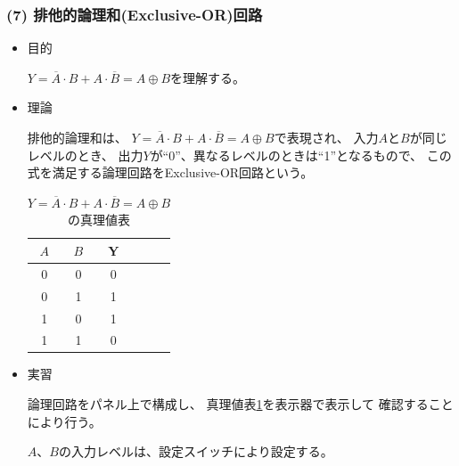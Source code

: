 \documentclass[12pt]{jarticle}
\begin{document}
\subsubsection*{(7) 排他的論理和(Exclusive-OR)回路}
\begin{itemize}
    \item 目的

          $Y = \overline{A} \cdot B + A \cdot \overline{B} = A \oplus B$を理解する。

    \item 理論

          排他的論理和は、
          $Y = \overline{A} \cdot B + A \cdot \overline{B} = A \oplus B$で表現され、
          入力$A$と$B$が同じレベルのとき、
          出力$Y$が``0''、異なるレベルのときは``1''となるもので、
          この式を満足する論理回路をExclusive-OR回路という。

          \begin{table}[h]
              \caption{$Y = \overline{A} \cdot B + A \cdot \overline{B} = A \oplus B$ の真理値表}
              \begin{center}
                  \begin{tabular}{|c|c|c|c|c|}
                      \hline
                      $A$ & $B$ & Y \\
                      \hline
                      0   & 0   & 0 \\
                      \hline
                      0   & 1   & 1 \\
                      \hline
                      1   & 0   & 1 \\
                      \hline
                      1   & 1   & 0 \\
                      \hline
                  \end{tabular}
              \end{center}
              \label{table8}
          \end{table}

    \item 実習

          論理回路をパネル上で構成し、
          真理値表\ref{table8}を表示器で表示して
          確認することにより行う。

          $A$、$B$の入力レベルは、設定スイッチにより設定する。
\end{itemize}
\end{document}
